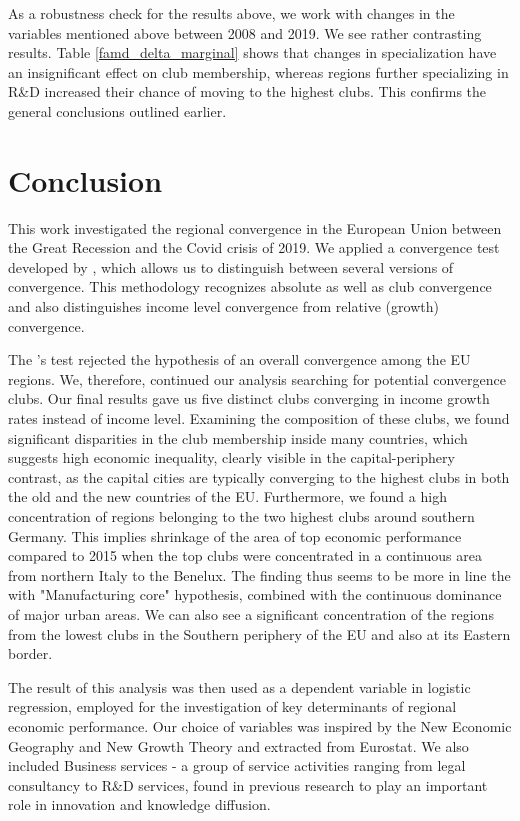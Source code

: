 \documentclass[11pt]{article}
\begin{document}
As a robustness check for the results above, we work with changes in the variables mentioned above between 2008 and 2019. We see rather contrasting results. Table \ref{famd_delta_marginal} shows that changes in specialization have an insignificant effect on club membership, whereas regions further specializing in R\&D increased their chance of moving to the highest clubs. This confirms the general conclusions outlined earlier.

\section{Conclusion}

This work investigated the regional convergence in the European Union between the Great Recession and the Covid crisis of 2019. We applied a convergence test developed by \citet{phillips2009economic}, which allows us to distinguish between several versions of convergence. This methodology recognizes absolute as well as club convergence and also distinguishes income level convergence from relative (growth) convergence.

The \citeauthor{phillips2009economic}'s test rejected the hypothesis of an overall convergence among the EU regions. We, therefore, continued our analysis searching for potential convergence clubs. Our final results gave us five distinct clubs converging in income growth rates instead of income level. Examining the composition of these clubs, we found significant disparities in the club membership inside many countries, which suggests high economic inequality, clearly visible in the capital-periphery contrast, as the capital cities are typically converging to the highest clubs in both the old and the new countries of the EU. Furthermore, we found a high concentration of regions belonging to the two highest clubs around southern Germany. This implies shrinkage of the area of top economic performance compared to 2015 when the top clubs were concentrated in a continuous area from northern Italy to the Benelux. The finding thus seems to be more in line the with "Manufacturing core" hypothesis, combined with the continuous dominance of major urban areas. We can also see a significant concentration of the regions from the lowest clubs in the Southern periphery of the EU and also at its Eastern border.

The result of this analysis was then used as a dependent variable in logistic regression, employed for the investigation of key determinants of regional economic performance. Our choice of variables was inspired by the New Economic Geography and New Growth Theory and extracted from Eurostat. We also included Business services - a group of service activities ranging from legal consultancy to R\&D services, found in previous research to play an important role in innovation and knowledge diffusion.
\end{document}

